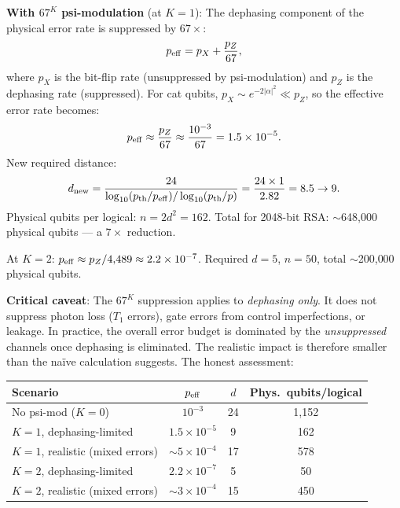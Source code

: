 \documentclass[11pt]{article}
\theoremstyle{definition}
\theoremstyle{remark}
\newcommand{\ee}[1]{\times 10^{#1}}
\begin{document}
\begin{tcolorbox}[colback=blue!5!white, colframe=blue!60!black,
  title=\textbf{W4i17 TOP 5 FINDINGS --- READ FIRST}]
\begin{enumerate}[nosep]
  \textbf{With $67^K$ psi-modulation} (at $K=1$): The dephasing component
  of the physical error rate is suppressed by $67\times$:
  \begin{equation}
    p_{\rm eff} = p_X + \frac{p_Z}{67},
  \end{equation}
  where $p_X$ is the bit-flip rate (unsuppressed by psi-modulation) and
  $p_Z$ is the dephasing rate (suppressed). For cat qubits, $p_X \sim
  e^{-2|\alpha|^2} \ll p_Z$, so the effective error rate becomes:
  \begin{equation}
    p_{\rm eff} \approx \frac{p_Z}{67} \approx \frac{10^{-3}}{67}
    = 1.5\ee{-5}.
  \end{equation}
  New required distance:
  \begin{equation}
    d_{\rm new} = \frac{24}{\log_{10}(p_{\rm th}/p_{\rm eff})
    / \log_{10}(p_{\rm th}/p)} = \frac{24 \times 1}{2.82} = 8.5
    \rightarrow 9.
  \end{equation}
  Physical qubits per logical: $n = 2d^2 = 162$. Total for 2048-bit RSA:
  $\sim$648{,}000 physical qubits --- a $7\times$ reduction.

  At $K=2$: $p_{\rm eff} \approx p_Z / 4{,}489 \approx 2.2\ee{-7}$.
  Required $d = 5$, $n = 50$, total $\sim$200{,}000 physical qubits.

  \textbf{Critical caveat}: The $67^K$ suppression applies to
  \emph{dephasing only}. It does not suppress photon loss ($T_1$ errors),
  gate errors from control imperfections, or leakage. In practice, the
  overall error budget is dominated by the \emph{unsuppressed} channels
  once dephasing is eliminated. The realistic impact is therefore smaller
  than the na\"ive calculation suggests. The honest assessment:

  \begin{center}
  \begin{tabular}{@{}lccc@{}}
  \toprule
  Scenario & $p_{\rm eff}$ & $d$ & Phys.\ qubits/logical \\
  \midrule
  No psi-mod ($K=0$) & $10^{-3}$ & 24 & 1{,}152 \\
  $K=1$, dephasing-limited & $1.5\ee{-5}$ & 9 & 162 \\
  $K=1$, realistic (mixed errors) & $\sim 5\ee{-4}$ & 17 & 578 \\
  $K=2$, dephasing-limited & $2.2\ee{-7}$ & 5 & 50 \\
  $K=2$, realistic (mixed errors) & $\sim 3\ee{-4}$ & 15 & 450 \\
  \bottomrule
  \end{tabular}
  \end{center}


\end{enumerate}
\end{tcolorbox}
\end{document}
